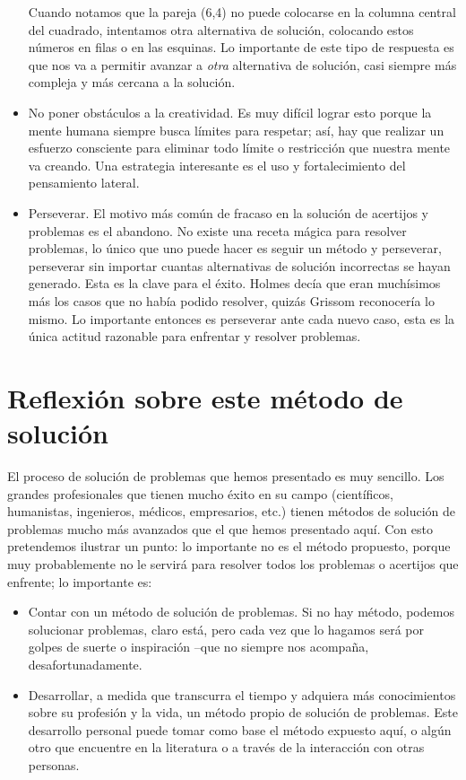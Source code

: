 \begin{itemize}
Cuando notamos que la pareja (6,4) no puede colocarse en la columna
central del cuadrado, intentamos otra alternativa de solución, colocando
estos números en filas o en las esquinas. Lo importante de este tipo
de respuesta es que nos va a permitir avanzar a {\em otra} alternativa
de solución, casi siempre más compleja y más cercana a la solución.
\item No poner obstáculos a la creatividad. Es muy difícil lograr esto porque
la mente humana siempre busca límites para respetar; así, hay que
realizar un esfuerzo consciente para eliminar todo límite o restricción
que nuestra mente va creando. Una estrategia interesante es el uso
y fortalecimiento del pensamiento lateral.
\item Perseverar. El motivo más común de fracaso en la solución de acertijos
y problemas es el abandono. No existe una receta mágica para resolver
problemas, lo único que uno puede hacer es seguir un método y perseverar,
perseverar sin importar cuantas alternativas de solución incorrectas
se hayan generado. Esta es la clave para el éxito. Holmes decía que
eran muchísimos más los casos que no había podido resolver, quizás
Grissom reconocería lo mismo. Lo importante entonces es perseverar
ante cada nuevo caso, esta es la única actitud razonable para enfrentar
y resolver problemas.
\end{itemize}

\section{Reflexión sobre este método de solución}

El proceso de solución de problemas que hemos presentado es muy sencillo.
Los grandes profesionales que tienen mucho éxito en su campo (científicos,
humanistas, ingenieros, médicos, empresarios, etc.) tienen métodos
de solución de problemas mucho más avanzados que el que hemos presentado
aquí. Con esto pretendemos ilustrar un punto: lo importante no es
el método propuesto, porque muy probablemente no le servirá para resolver
todos los problemas o acertijos que enfrente; lo importante es:
\begin{itemize}
\item Contar con un método de solución de problemas. Si no hay método, podemos
solucionar problemas, claro está, pero cada vez que lo hagamos será
por golpes de suerte o inspiración –que no siempre nos acompaña, desafortunadamente.
\item Desarrollar, a medida que transcurra el tiempo y adquiera más conocimientos
sobre su profesión y la vida, un método propio de solución de problemas.
Este desarrollo personal puede tomar como base el método expuesto
aquí, o algún otro que encuentre en la literatura o a través de la
interacción con otras personas.
\end{itemize}

